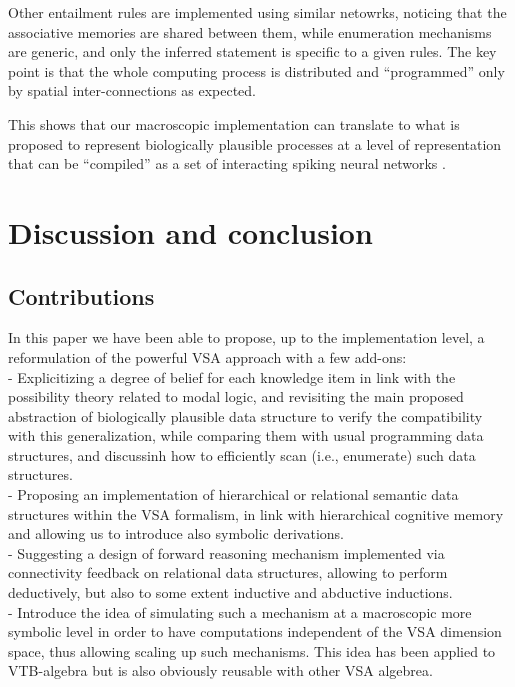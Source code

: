 \documentclass[sn-mathphys]{sn-jnl}
\begin{document}
Other entailment rules are implemented using similar netowrks, noticing that the associative memories are shared between them, while enumeration mechanisms are generic, and only the inferred statement is specific to a given rules. The key point is that the whole computing process is distributed and ``programmed'' only by spatial inter-connections as expected.

This shows that our macroscopic implementation can translate to what is proposed to represent biologically plausible processes at a level of representation that can be ``compiled'' as a set of interacting spiking neural networks \cite{eliasmith_how_2013}.

\section{Discussion and conclusion}

\subsection{Contributions}

In this paper we have been able to propose, up to the implementation level, a reformulation of the powerful VSA approach with a few add-ons:
\\- Explicitizing a degree of belief for each knowledge item in link with the possibility theory related to modal logic, and revisiting the main proposed abstraction of biologically plausible data structure to verify the compatibility with this generalization, while comparing them with usual programming data structures, and discussinh how to efficiently scan (i.e., enumerate) such data structures.
\\- Proposing an implementation of hierarchical or relational semantic data structures within the VSA formalism, in link with hierarchical cognitive memory and allowing us to introduce also symbolic derivations.
\\- Suggesting a design of forward reasoning mechanism implemented via connectivity feedback on relational data structures, allowing to perform deductively, but also to some extent inductive and abductive inductions.
\\- Introduce the idea of simulating such a mechanism at a macroscopic more symbolic level in order to have computations independent of the VSA dimension space, thus allowing scaling up such mechanisms. This idea has been applied to VTB-algebra but is also obviously reusable with other VSA algebrea.
\end{document}
